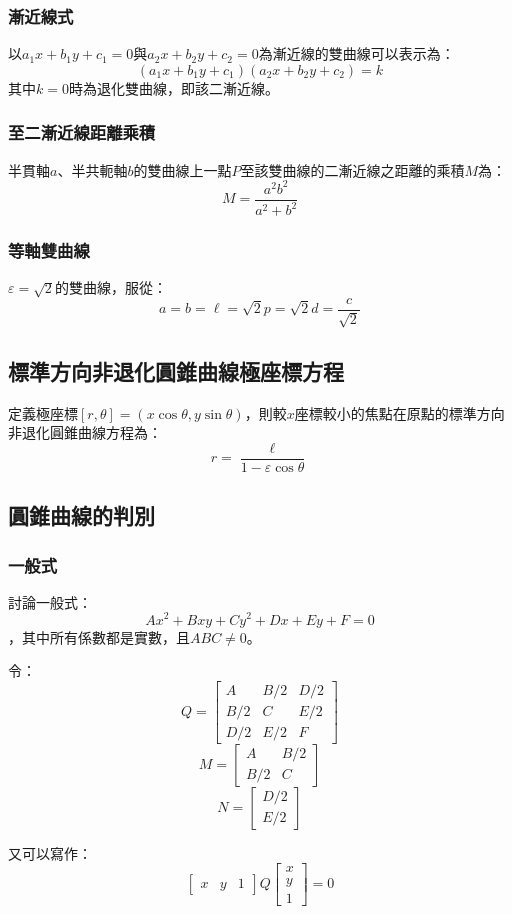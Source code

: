 \documentclass[a4paper,12pt]{report}
\begin{document}
\subsubsection{漸近線式}
以$a_1x+b_1y+c_1=0$與$a_2x+b_2y+c_2=0$為漸近線的雙曲線可以表示為：
\[(a_1x+b_1y+c_1)(a_2x+b_2y+c_2)=k\]
其中$k=0$時為退化雙曲線，即該二漸近線。
\subsubsection{至二漸近線距離乘積}
半貫軸$a$、半共軛軸$b$的雙曲線上一點$P$至該雙曲線的二漸近線之距離的乘積$M$為：
\[M=\frac{a^2b^2}{a^2+b^2}\]
\subsubsection{等軸雙曲線}
$\varepsilon=\sqrt{2}$的雙曲線，服從：
\[a=b=\ell=\sqrt{2}p=\sqrt{2}d=\frac{c}{\sqrt{2}}\]
\subsection{標準方向非退化圓錐曲線極座標方程}
定義極座標$[r,\theta]=(x\cos\theta,y\sin\theta)$，則較$x$座標較小的焦點在原點的標準方向非退化圓錐曲線方程為：
\[r=\frac{\ell}{1-\varepsilon\cos\theta}\]
\subsection{圓錐曲線的判別}
\subsubsection{一般式}
討論一般式：
\[Ax^2+Bxy+Cy^2+Dx+Ey+F=0\]
，其中所有係數都是實數，且$ABC\neq 0$。

令：
\[Q=\begin{bmatrix} A & B/2 & D/2 \\ B/2 & C & E/2 \\ D/2 & E/2 & F \end{bmatrix}\]
\[ M =
\begin{bmatrix} A & B/2 \\ B/2 & C \end{bmatrix}\]
\[N =
\begin{bmatrix} D/2 \\ E/2 \end{bmatrix}\]

又可以寫作：
\[\begin{bmatrix} x & y & 1 \end{bmatrix}
Q\begin{bmatrix} x \\ y \\ 1 \end{bmatrix} = 0\]
\end{document}

